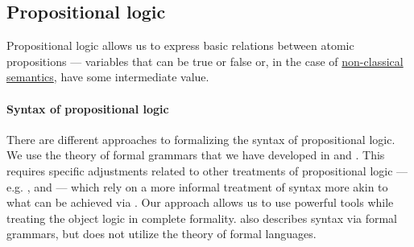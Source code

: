 \subsection{Propositional logic}\label{subsec:propositional_logic}

Propositional logic allows us to express basic relations between atomic propositions --- variables that can be true or false or, in the case of \hyperref[def:propositional_semantics]{non-classical semantics}, have some intermediate value.

\paragraph{Syntax of propositional logic}\hfill

There are different approaches to formalizing the syntax of propositional logic. We use the theory of formal grammars that we have developed in  and . This requires specific adjustments related to other treatments of propositional logic --- e.g. ,  and  --- which rely on a more informal treatment of syntax more akin to what can be achieved via . Our approach allows us to use powerful tools while treating the object logic in complete formality.  also describes syntax via formal grammars, but does not utilize the theory of formal languages.

